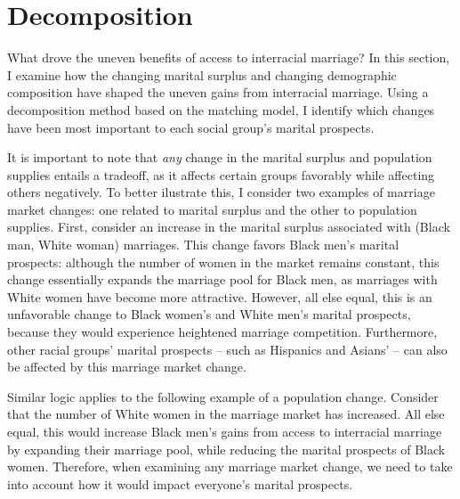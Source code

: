 \section{Decomposition} \label{sec:decomposition}

What drove the uneven benefits of access to interracial marriage? In this section, I examine how the changing marital surplus and changing demographic composition have shaped the uneven gains from interracial marriage. Using a decomposition method based on the matching model, I identify which changes have been most important to each social group's marital prospects. 


It is important to note that \textit{any} change in the marital surplus and population supplies entails a tradeoff, as it affects certain groups favorably while affecting others negatively. To better ilustrate this, I consider two examples of marriage market changes:  one related to marital surplus and the other to population supplies. First, consider an increase in the marital surplus associated with (Black man, White woman) marriages. This change favors Black men's marital prospects: although the number of women in the market remains constant, this change essentially expands the marriage pool for Black men, as marriages with White women have become more attractive. However, all else equal, this is an unfavorable change to Black women's and White men's marital prospects, because they would experience heightened marriage competition. Furthermore, other racial groups' marital prospects -- such as Hispanics and Asians' -- can also be affected by this marriage market change. 

Similar logic applies to the following example of a population change. Consider that the number of White women in the marriage market has increased. All else equal, this would increase Black men's gains from access to interracial marriage by expanding their marriage pool, while reducing the marital prospects of Black women. Therefore, when examining any marriage market change, we need to take into account how it would impact everyone's marital prospects. 

